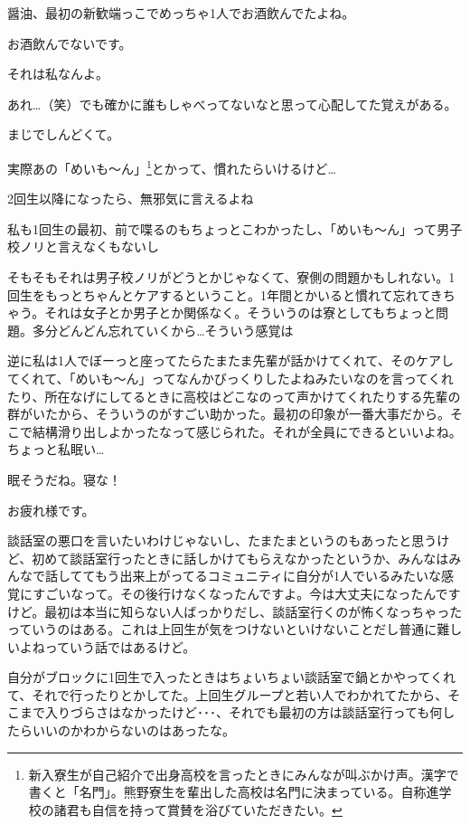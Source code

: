 \begin{multicols}{2}
  醤油、最初の新歓端っこでめっちゃ1人でお酒飲んでたよね。

  お酒飲んでないです。

  それは私なんよ。

  あれ…（笑）でも確かに誰もしゃべってないなと思って心配してた覚えがある。

  まじでしんどくて。

  実際あの「めいも～ん」\footnote{新入寮生が自己紹介で出身高校を言ったときにみんなが叫ぶかけ声。漢字で書くと「名門」。熊野寮生を輩出した高校は名門に決まっている。自称進学校の諸君も自信を持って賞賛を浴びていただきたい。}とかって、慣れたらいけるけど…

  2回生以降になったら、無邪気に言えるよね

  私も1回生の最初、前で喋るのもちょっとこわかったし、「めいも～ん」って男子校ノリと言えなくもないし

  そもそもそれは男子校ノリがどうとかじゃなくて、寮側の問題かもしれない。1回生をもっとちゃんとケアするということ。1年間とかいると慣れて忘れてきちゃう。それは女子とか男子とか関係なく。そういうのは寮としてもちょっと問題。多分どんどん忘れていくから…そういう感覚は

  逆に私は1人でぼーっと座ってたらたまたま先輩が話かけてくれて、そのケアしてくれて、「めいも～ん」ってなんかびっくりしたよねみたいなのを言ってくれたり、所在なげにしてるときに高校はどこなのって声かけてくれたりする先輩の群がいたから、そういうのがすごい助かった。最初の印象が一番大事だから。そこで結構滑り出しよかったなって感じられた。それが全員にできるといいよね。ちょっと私眠い…

  眠そうだね。寝な！

  お疲れ様です。


  談話室の悪口を言いたいわけじゃないし、たまたまというのもあったと思うけど、初めて談話室行ったときに話しかけてもらえなかったというか、みんなはみんなで話しててもう出来上がってるコミュニティに自分が1人でいるみたいな感覚にすごいなって。その後行けなくなったんですよ。今は大丈夫になったんですけど。最初は本当に知らない人ばっかりだし、談話室行くのが怖くなっちゃったっていうのはある。これは上回生が気をつけないといけないことだし普通に難しいよねっていう話ではあるけど。

  自分がブロックに1回生で入ったときはちょいちょい談話室で鍋とかやってくれて、それで行ったりとかしてた。上回生グループと若い人でわかれてたから、そこまで入りづらさはなかったけど･･･、それでも最初の方は談話室行っても何したらいいのかわからないのはあったな。


\end{multicols}
